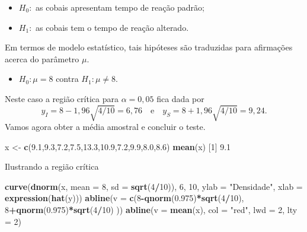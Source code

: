 \documentclass[10pt,a4paper]{book}
\newenvironment{Shaded}{\begin{snugshade}}{\end{snugshade}}
\newcommand{\KeywordTok}[1]{\textcolor[rgb]{0.13,0.29,0.53}{\textbf{#1}}}
\newcommand{\DataTypeTok}[1]{\textcolor[rgb]{0.13,0.29,0.53}{#1}}
\newcommand{\DecValTok}[1]{\textcolor[rgb]{0.00,0.00,0.81}{#1}}
\newcommand{\FloatTok}[1]{\textcolor[rgb]{0.00,0.00,0.81}{#1}}
\newcommand{\StringTok}[1]{\textcolor[rgb]{0.31,0.60,0.02}{#1}}
\newcommand{\OperatorTok}[1]{\textcolor[rgb]{0.81,0.36,0.00}{\textbf{#1}}}
\newcommand{\NormalTok}[1]{#1}
\providecommand{\tightlist}{%
  \setlength{\itemsep}{0pt}\setlength{\parskip}{0pt}}
\begin{document}
\begin{itemize}
\tightlist
\item
  \(H_0:\) as cobais apresentam tempo de reação padrão;
\item
  \(H_1:\) as cobais tem o tempo de reação alterado.
\end{itemize}

Em termos de modelo estatístico, tais hipóteses são traduzidas para
afirmações acerca do parâmetro \(\mu\).

\begin{itemize}
\tightlist
\item
  \(H_0: \mu = 8\) contra \(H_1: \mu \neq 8\).
\end{itemize}

Neste caso a região crítica para \(\alpha = 0,05\) fica dada por
\[y_I = 8 - 1,96\sqrt{4/10} = 6,76 \quad \text{e} \quad y_S = 8 + 1,96 \sqrt{4/10} = 9,24.\]
Vamos agora obter a média amostral e concluir o teste.

\begin{Shaded}
\begin{Highlighting}[]
\NormalTok{x <-}\StringTok{ }\KeywordTok{c}\NormalTok{(}\FloatTok{9.1}\NormalTok{,}\FloatTok{9.3}\NormalTok{,}\FloatTok{7.2}\NormalTok{,}\FloatTok{7.5}\NormalTok{,}\FloatTok{13.3}\NormalTok{,}\FloatTok{10.9}\NormalTok{,}\FloatTok{7.2}\NormalTok{,}\FloatTok{9.9}\NormalTok{,}\FloatTok{8.0}\NormalTok{,}\FloatTok{8.6}\NormalTok{)}
\KeywordTok{mean}\NormalTok{(x)}
\NormalTok{[}\DecValTok{1}\NormalTok{] }\FloatTok{9.1}
\end{Highlighting}
\end{Shaded}

Ilustrando a região crítica

\begin{Shaded}
\begin{Highlighting}[]
\KeywordTok{curve}\NormalTok{(}\KeywordTok{dnorm}\NormalTok{(x, }\DataTypeTok{mean =} \DecValTok{8}\NormalTok{, }\DataTypeTok{sd =} \KeywordTok{sqrt}\NormalTok{(}\DecValTok{4}\OperatorTok{/}\DecValTok{10}\NormalTok{)), }\DecValTok{6}\NormalTok{, }\DecValTok{10}\NormalTok{, }
      \DataTypeTok{ylab =} \StringTok{"Densidade"}\NormalTok{, }\DataTypeTok{xlab =} \KeywordTok{expression}\NormalTok{(}\KeywordTok{hat}\NormalTok{(y)))}
\KeywordTok{abline}\NormalTok{(}\DataTypeTok{v =} \KeywordTok{c}\NormalTok{(}\DecValTok{8}\OperatorTok{-}\KeywordTok{qnorm}\NormalTok{(}\FloatTok{0.975}\NormalTok{)}\OperatorTok{*}\KeywordTok{sqrt}\NormalTok{(}\DecValTok{4}\OperatorTok{/}\DecValTok{10}\NormalTok{), }\DecValTok{8}\OperatorTok{+}\KeywordTok{qnorm}\NormalTok{(}\FloatTok{0.975}\NormalTok{)}\OperatorTok{*}\KeywordTok{sqrt}\NormalTok{(}\DecValTok{4}\OperatorTok{/}\DecValTok{10}\NormalTok{) ))}
\KeywordTok{abline}\NormalTok{(}\DataTypeTok{v =} \KeywordTok{mean}\NormalTok{(x), }\DataTypeTok{col =} \StringTok{"red"}\NormalTok{, }\DataTypeTok{lwd =} \DecValTok{2}\NormalTok{, }\DataTypeTok{lty =} \DecValTok{2}\NormalTok{)}
\end{Highlighting}
\end{Shaded}
\end{document}

